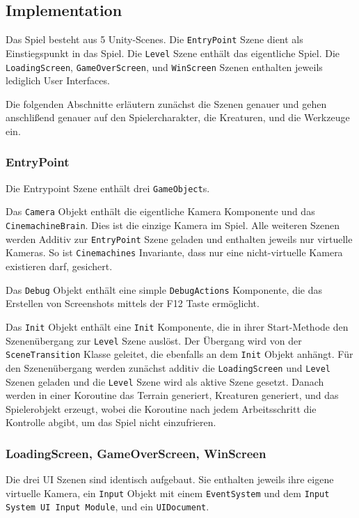  
\subsection{Implementation}
Das Spiel besteht aus 5 Unity-Scenes.
Die \texttt{EntryPoint} Szene dient als Einstiegspunkt in das Spiel.
Die \texttt{Level} Szene enthält das eigentliche Spiel.
Die \texttt{LoadingScreen}, \texttt{GameOverScreen}, und \texttt{WinScreen} Szenen enthalten jeweils lediglich User Interfaces.

Die folgenden Abschnitte erläutern zunächst die Szenen genauer und gehen anschlißend genauer auf den Spielercharakter, die Kreaturen, und die Werkzeuge ein.

\subsubsection{EntryPoint}
Die Entrypoint Szene enthält drei \texttt{GameObject}s.

Das \texttt{Camera} Objekt enthält die eigentliche Kamera Komponente und das \texttt{CinemachineBrain}.
Dies ist die einzige Kamera im Spiel.
Alle weiteren Szenen werden Additiv zur \texttt{EntryPoint} Szene geladen und enthalten jeweils nur virtuelle Kameras.
So ist \texttt{Cinemachines} Invariante, dass nur eine nicht-virtuelle Kamera existieren darf, gesichert.

Das \texttt{Debug} Objekt enthält eine simple \texttt{DebugActions} Komponente, die das Erstellen von Screenshots mittels der F12 Taste ermöglicht.

Das \texttt{Init} Objekt enthält eine \texttt{Init} Komponente, die in ihrer Start-Methode den Szenenübergang zur \texttt{Level} Szene auslöst.
Der Übergang wird von der \texttt{SceneTransition} Klasse geleitet, die ebenfalls an dem \texttt{Init} Objekt anhängt.
Für den Szenenübergang werden zunächst additiv die \texttt{LoadingScreen} und \texttt{Level} Szenen geladen und die \texttt{Level} Szene wird als aktive Szene gesetzt.
Danach werden in einer Koroutine das Terrain generiert, Kreaturen generiert, und das Spielerobjekt erzeugt, wobei die Koroutine nach jedem Arbeitsschritt die Kontrolle abgibt, um das Spiel nicht einzufrieren.

\subsubsection{LoadingScreen, GameOverScreen, WinScreen}
Die drei UI Szenen sind identisch aufgebaut.
Sie enthalten jeweils ihre eigene virtuelle Kamera, ein \texttt{Input} Objekt mit einem \texttt{EventSystem} und dem \texttt{Input System UI Input Module}, und ein \texttt{UIDocument}.

